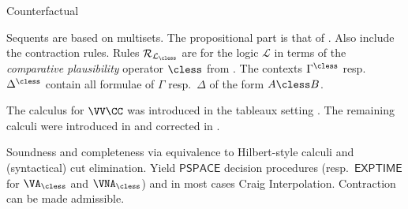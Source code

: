 \begin{entry}{Counterfactual}
\begin{calculus}

\end{calculus}

\begin{clarifications}
  Sequents are based on multisets.  The propositional part is that of
  \Gtc {}. Also include the contraction rules.  Rules
  $\Rules_{\mathcal{L}_\cless}$ are for the logic $\mathcal{L}$ in
  terms of the \emph{comparative plausibility} operator $\cless$ from
  \cite{Lewis:1973uq}.  The contexts $\Gamma^\cless$ resp.\
  $\Delta^\cless$ contain all formulae of $\Gamma$ resp.\ $\Delta$ of
  the form $A \cless B$.
\end{clarifications}

\begin{history}
  The calculus for $\VV\CC$ was introduced in the tableaux setting
  \cite{Swart:1983uq,Gent:1992p3090}.  The remaining calculi were
  introduced in \cite{Lellmann:2012fk,Lellmann:2013fk} and corrected
  in \cite{Lellmann:2013}.
\end{history}

\begin{technicalities}
  Soundness and completeness via equivalence to Hilbert-style calculi
  and (syntactical) cut elimination. Yield $\mathsf{PSPACE}$ decision
  procedures (resp.\ $\mathsf{EXPTIME}$ for $\VA_\cless$ and
  $\VNA_\cless$) and in most cases Craig Interpolation. Contraction
  can be made admissible. \cite{Lellmann:2012fk,Lellmann:2013}
\end{technicalities}
%
\end{entry}

